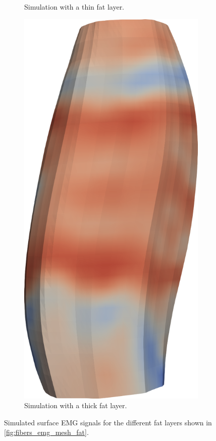 \begin{figure}[H]
\begin{subfigure}[t]{0.25\textwidth}
    \caption{Simulation with a thin fat layer.}%
    \label{fig:fibers_emg_thin_fat}%
  \end{subfigure}  \quad
  \begin{subfigure}[t]{0.28\textwidth}%
    \centering%
    \includegraphics[width=\textwidth]{images/results/application/fibers_emg_thick_fat.png}%
    \caption{Simulation with a thick fat layer.}%
    \label{fig:fibers_emg_thick_fat}%
  \end{subfigure}   
  \caption{Simulated surface EMG signals for the different fat layers shown in \cref{fig:fibers_emg_mesh_fat}.}%
  \label{fig:fibers_emg_fat}%
\end{figure}%

